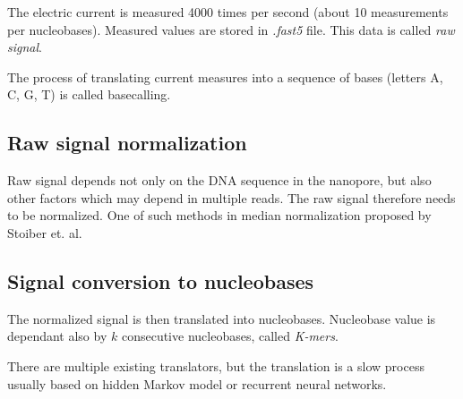 The electric current is measured 4000 times per second (about 10 measurements per nucleobases).
Measured values are stored in \textit{.fast5} file. This data is called \textit{raw signal}.

The process of translating current measures into a sequence of bases (letters A, C, G, T) is called
basecalling.

\subsection{Raw signal normalization}

Raw signal depends not only on the DNA sequence in the nanopore, but also other factors which may
depend in multiple reads. The raw signal therefore needs to be normalized. One of such methods in
median normalization proposed by Stoiber et. al. \cite{batmendijn_bakalarka}

\subsection{Signal conversion to nucleobases}

The normalized signal is then translated into nucleobases. Nucleobase value is dependant also by $k$
consecutive nucleobases, called \textit{K-mers}. 

There are multiple existing translators, but the translation is a slow process usually based on
hidden Markov model or recurrent neural networks. \cite{barbora_bakalarka}
